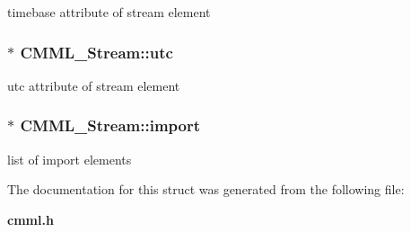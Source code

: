 timebase attribute of stream element 
\subsubsection{$\ast$ {\bf CMML\_\-Stream::utc}}\label{structCMML__Stream_o2}


utc attribute of stream element 
\subsubsection{$\ast$ {\bf CMML\_\-Stream::import}}\label{structCMML__Stream_o3}


list of import elements 

The documentation for this struct was generated from the following file:\begin{CompactItemize}
\item 
{\bf cmml.h}\end{CompactItemize}
